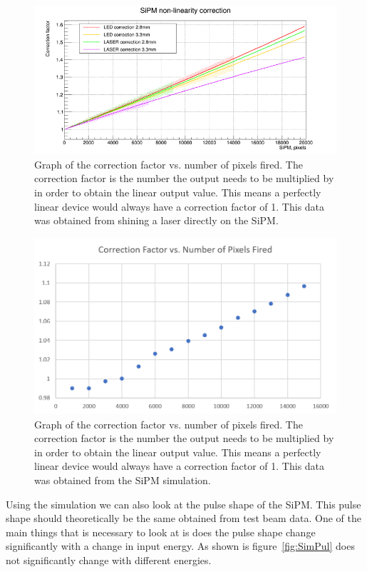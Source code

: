 \begin{figure}
\centering
\includegraphics[width=\linewidth]{Figures/LaserNonLin.png}
\caption{Graph of the correction factor vs. number of pixels fired. The correction factor is the number the output needs to be multiplied by in order to obtain the linear output value. This means a perfectly linear device would always have a correction factor of 1. This data was obtained from shining a laser directly on the SiPM.}
\label{fig:NonLin}
\end{figure}

\begin{figure}
\centering
\includegraphics[width=\linewidth]{Figures/CorFac.png}
\caption{Graph of the correction factor vs. number of pixels fired. The correction factor is the number the output needs to be multiplied by in order to obtain the linear output value. This means a perfectly linear device would always have a correction factor of 1. This data was obtained from the SiPM simulation.}
\label{fig:Cor}
\end{figure}

Using the simulation we can also look at the pulse shape of the SiPM. This pulse shape should theoretically be the same obtained from test beam data. One of the main things that is necessary to look at is does the pulse shape change significantly with a change in input energy. As shown is figure~\ref{fig:SimPul} does not significantly change with different energies.

